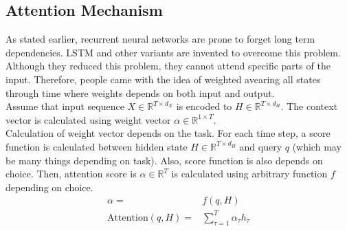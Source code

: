 \subsection{Attention Mechanism}
As stated earlier, recurrent neural networks are prone to forget long term dependencies. LSTM and other variants are invented to overcome this problem. Although they reduced this problem, they cannot attend specific parts of the input. Therefore, people came with the idea of weighted avearing all states through time where weights depends on both input and output. \\
Assume that input sequence $X \in \mathbb{R}^{T \times d_X}$ is encoded to $H \in \mathbb{R}^{T \times d_H}$. The context vector is calculated using weight vector $\alpha \in \mathbb{R}^{1 \times T}$. \\
Calculation of weight vector depends on the task. For each time step, a score function is calculated between hidden state $H \in \mathbb{R}^{T \times d_H}$ and query $q$ (which may be many things depending on task). Also, score function is also depends on choice. Then, attention score is $\alpha \in \mathbb{R}^{T}$ is calculated using arbitrary function $f$ depending on choice. \\
\begin{equation}
\begin{split}
\alpha = & f(q, H) \\
\mathrm{Attention}(q, H) = & \sum_{\tau=1}^{T} \alpha_{\tau} h_{\tau}
\end{split}
\end{equation}
%
